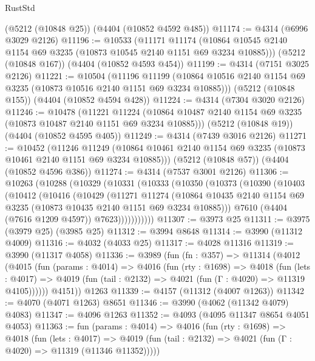 \begin{lexlean}{RustStd}
\begin{coremodule}
    (@5212 (@10848 @25))
    (@4404 (@10852 @4592 @485))
@11174 := @4314 (@6996 @3029 @2126)
@11196 := @10533
    (@11171
      @11174
      (@10864 @10545 @2140 @1154 @69 @3235 (@10873 @10545 @2140 @1151 @69 @3234 @10885)))
    (@5212 (@10848 @167))
    (@4404 (@10852 @4593 @454))
@11199 := @4314 (@7151 @3025 @2126)
@11221 := @10504
    (@11196
      @11199
      (@10864 @10516 @2140 @1154 @69 @3235 (@10873 @10516 @2140 @1151 @69 @3234 @10885)))
    (@5212 (@10848 @155))
    (@4404 (@10852 @4594 @428))
@11224 := @4314 (@7304 @3020 @2126)
@11246 := @10478
    (@11221
      @11224
      (@10864 @10487 @2140 @1154 @69 @3235 (@10873 @10487 @2140 @1151 @69 @3234 @10885)))
    (@5212 (@10848 @19))
    (@4404 (@10852 @4595 @405))
@11249 := @4314 (@7439 @3016 @2126)
@11271 := @10452
    (@11246
      @11249
      (@10864 @10461 @2140 @1154 @69 @3235 (@10873 @10461 @2140 @1151 @69 @3234 @10885)))
    (@5212 (@10848 @57))
    (@4404 (@10852 @4596 @386))
@11274 := @4314 (@7537 @3001 @2126)
@11306 := @10263
    (@10288
      (@10329
        (@10331
          (@10333
            (@10350
              (@10373
                (@10390
                  (@10403
                    (@10412
                      (@10416
                        (@10429
                          (@11271
                            @11274
                            (@10864
                              @10435
                              @2140
                              @1154
                              @69
                              @3235
                              (@10873 @10435 @2140 @1151 @69 @3234 @10885)))
                          @7610
                          (@4404 (@7616 @1209 @4597))
                          @7623)))))))))))
@11307 := @3973 @25
@11311 := @3975 (@3979 @25) (@3985 @25)
@11312 := @3994 @8648
@11314 := @3990 (@11312 @4009)
@11316 := @4032 (@4033 @25)
@11317 := @4028 @11316
@11319 := @3990 (@11317 @4058)
@11336 := @3989
    (fun (fn : @357) =>
    @11314
      (@4012
        (@4015
          (fun (params : @4014) =>
          @4016
            (fun (rty : @1698) =>
            @4018
              (fun (lets : @4017) =>
              @4019 (fun (tail : @2132) => @4021 (fun (Γ : @4020) => @11319 @4105))))))
        @4151))
    @1263
@11339 := @4157 (@11312 (@4007 @1263))
@11342 := @4070 (@4071 @1263) @8651
@11346 := @3990 (@4062 (@11342 @4079) @4083)
@11347 := @4096 @1263
@11352 := @4093 (@4095 @11347 @8654 @4051 @4053)
@11363 := fun (params : @4014) =>
  @4016
    (fun (rty : @1698) =>
    @4018
      (fun (lets : @4017) =>
      @4019 (fun (tail : @2132) => @4021 (fun (Γ : @4020) => @11319 (@11346 @11352)))))

\end{coremodule}
\end{lexlean}
